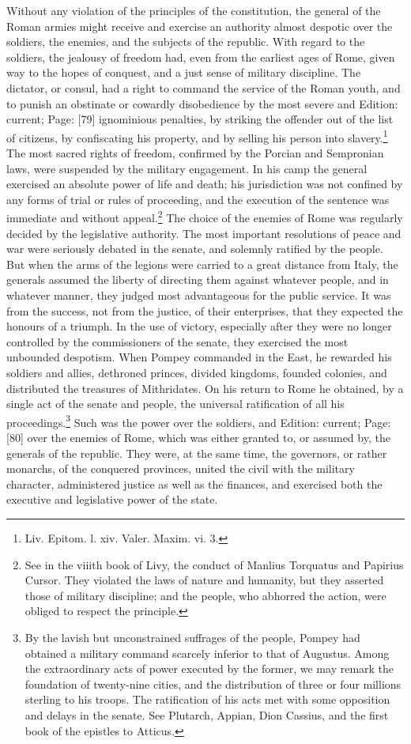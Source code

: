 Without any violation of the principles of the constitution, the general of the Roman armies might receive and exercise an authority almost despotic over the soldiers, the enemies, and the subjects of the republic. With regard to the soldiers, the jealousy of freedom had, even from the earliest ages of Rome, given way to the hopes of conquest, and a just sense of military discipline. The dictator, or consul, had a right to command the service of the Roman youth, and to punish an obstinate or cowardly disobedience by the most severe and Edition: current; Page: [79] ignominious penalties, by striking the offender out of the list of citizens, by confiscating his property, and by selling his person into slavery.\footnote{Liv. Epitom. l. xiv. Valer. Maxim. vi. 3.} The most sacred rights of freedom, confirmed by the Porcian and Sempronian laws, were suspended by the military engagement. In his camp the general exercised an absolute power of life and death; his jurisdiction was not confined by any forms of trial or rules of proceeding, and the execution of the sentence was immediate and without appeal.\footnote{See in the viiith book of Livy, the conduct of Manlius Torquatus and Papirius Cursor. They violated the laws of nature and humanity, but they asserted those of military discipline; and the people, who abhorred the action, were obliged to respect the principle.} The choice of the enemies of Rome was regularly decided by the legislative authority. The most important resolutions of peace and war were seriously debated in the senate, and solemnly ratified by the people. But when the arms of the legions were carried to a great distance from Italy, the generals assumed the liberty of directing them against whatever people, and in whatever manner, they judged most advantageous for the public service. It was from the success, not from the justice, of their enterprises, that they expected the honours of a triumph. In the use of victory, especially after they were no longer controlled by the commissioners of the senate, they exercised the most unbounded despotism. When Pompey commanded in the East, he rewarded his soldiers and allies, dethroned princes, divided kingdoms, founded colonies, and distributed the treasures of Mithridates. On his return to Rome he obtained, by a single act of the senate and people, the universal ratification of all his proceedings.\footnote{By the lavish but unconstrained suffrages of the people, Pompey had obtained a military command scarcely inferior to that of Augustus. Among the extraordinary acts of power executed by the former, we may remark the foundation of twenty-nine cities, and the distribution of three or four millions sterling to his troops. The ratification of his acts met with some opposition and delays in the senate. See Plutarch, Appian, Dion Cassius, and the first book of the epistles to Atticus.} Such was the power over the soldiers, and Edition: current; Page: [80] over the enemies of Rome, which was either granted to, or assumed by, the generals of the republic. They were, at the same time, the governors, or rather monarchs, of the conquered provinces, united the civil with the military character, administered justice as well as the finances, and exercised both the executive and legislative power of the state.

